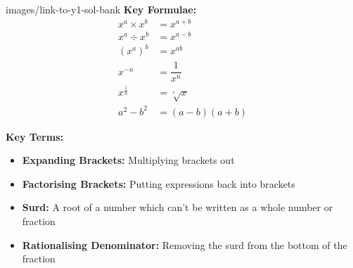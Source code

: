 \documentclass[fleqn]{article}
\begin{document}




\begin{keyinformation}{images/link-to-y1-sol-bank}
    \textbf{Key Formulae:}
    \begin{align*}
        x^a \times x^b &= x^{a+b}                    \\
        x^a \div x^b &= x^{a-b}                      \\
        (x^a)^b &= x^{ab}                            \\
        x^{-n} &= \dfrac{1}{x^n}                     \\
        x^{\tfrac{1}{n}} &= \sqrt[\textstyle{^n}]{x} \\
        a^2 - b^2 &= (a-b)(a+b)
    \end{align*}

    \textbf{Key Terms:}
    \begin{itemize}
        \item \textbf{Expanding Brackets:} Multiplying brackets out
        \item \textbf{Factorising Brackets:} Putting expressions back into brackets
        \item \textbf{Surd:} A root of a number which can't be written as a whole number or fraction
        \item \textbf{Rationalising Denominator:} Removing the surd from the bottom of the fraction
    \end{itemize}
\end{keyinformation}

\newpage
\pagestyle{attribution}
\end{document}
